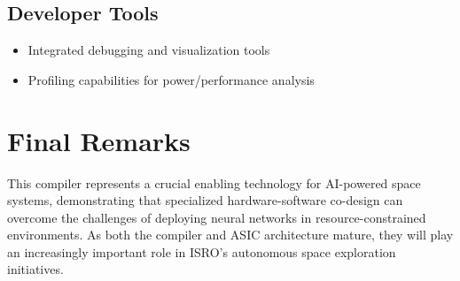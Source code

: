 \documentclass[12pt]{report}
\begin{document}
\subsection{Developer Tools}
\begin{itemize}
    \item Integrated debugging and visualization tools
    \item Profiling capabilities for power/performance analysis
\end{itemize}

\section{Final Remarks}
This compiler represents a crucial enabling technology for AI-powered space systems, demonstrating that specialized hardware-software co-design can overcome the challenges of deploying neural networks in resource-constrained environments. As both the compiler and ASIC architecture mature, they will play an increasingly important role in ISRO's autonomous space exploration initiatives.

\nocite{*}



\end{document}
